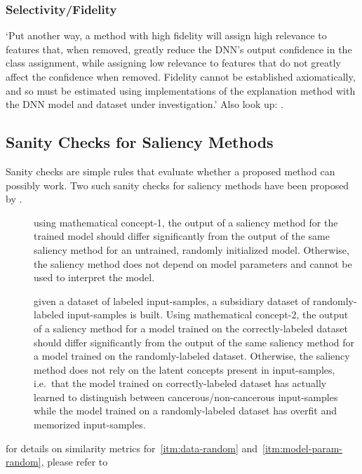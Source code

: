 \subsubsection{Selectivity/Fidelity}
`Put another way, a method with high fidelity will assign high relevance to features that, when removed, greatly reduce the DNN’s output confidence in the class assignment, while assigning low relevance to features that do not greatly affect the confidence when removed. Fidelity cannot be established axiomatically, and so must be estimated using implementations of the explanation method with the DNN model and dataset under investigation.'\cite{Tomsett.2019} Also look up: \citeauthor{Bach.2015, AlvarezMelis.2018}.

\subsection{Sanity Checks for Saliency Methods}
Sanity checks are simple rules that evaluate whether a proposed method can possibly work. Two such sanity checks for saliency methods have been proposed by .

\begin{description}
    \item[]
     using mathematical concept-1, the output of a saliency method for the trained model should differ significantly from the output of the same saliency method for an untrained, randomly initialized model. Otherwise, the saliency method does not depend on model parameters and cannot be used to interpret the model.
    \item[] given a dataset of labeled input-samples, a subsidiary dataset of randomly-labeled input-samples is built. Using mathematical concept-2, the output of a saliency method for a model trained on the correctly-labeled dataset should differ significantly from the output of the same saliency method for a model trained on the randomly-labeled dataset. Otherwise, the saliency method does not rely on the latent concepts present in input-samples, i.e.\ that the model trained on correctly-labeled dataset has actually learned to distinguish between cancerous/non-cancerous input-samples while the model trained on a randomly-labeled dataset has overfit and memorized input-samples.
\end{description}
for details on similarity metrics for~\ref{itm:data-random} and~\ref{itm:model-param-random}, please refer to~\cite{Adebayo.2018}

